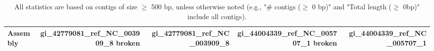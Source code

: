 \documentclass[12pt,a4paper]{article}
\begin{document}
\begin{table}[ht]
\begin{center}
\caption{All statistics are based on contigs of size $\geq$ 500 bp, unless otherwise noted (e.g., "\# contigs ($\geq$ 0 bp)" and "Total length ($\geq$ 0bp)" include all contigs).}
\begin{tabular}{|l*{4}{|r}|}
\hline
Assembly & gi\_42779081\_ref\_NC\_003909\_8 broken & gi\_42779081\_ref\_NC\_003909\_8 & gi\_44004339\_ref\_NC\_005707\_1 broken & gi\_44004339\_ref\_NC\_005707\_1 \\ \hline
\end{tabular}
\end{center}
\end{table}
\end{document}
